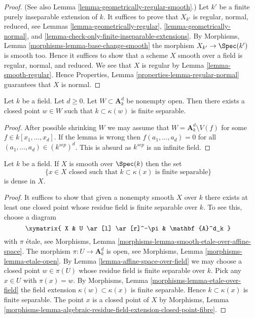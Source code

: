 \begin{proof}
(See also
Lemma \ref{lemma-geometrically-regular-smooth}.)
Let $k'$ be a finite purely inseparable extension of $k$.
It suffices to prove that $X_{k'}$ is regular, normal, reduced, see
Lemmas \ref{lemma-geometrically-regular},
\ref{lemma-geometrically-normal}, and
\ref{lemma-check-only-finite-inseparable-extensions}.
By
Morphisms, Lemma \ref{morphisms-lemma-base-change-smooth}
the morphism $X_{k'} \to \Spec(k')$ is smooth too.
Hence it suffices to show that a scheme $X$ smooth over a field is regular,
normal, and reduced. We see that $X$ is regular by
Lemma \ref{lemma-smooth-regular}.
Hence
Properties, Lemma \ref{properties-lemma-regular-normal}
guarantees that $X$ is normal.
\end{proof}

\begin{lemma}
\label{lemma-affine-space-over-field}
Let $k$ be a field. Let $d \geq 0$. Let $W \subset \mathbf{A}^d_k$
be nonempty open. Then there exists a closed point $w \in W$ such that
$k \subset \kappa(w)$ is finite separable.
\end{lemma}

\begin{proof}
After possible shrinking $W$ we may assume that
$W = \mathbf{A}^d_k \setminus V(f)$ for some $f \in k[x_1, \ldots, x_d]$.
If the lemma is wrong then $f(a_1, \ldots, a_d) = 0$ for all
$(a_1, \ldots, a_d) \in (k^{sep})^d$. This is absurd as $k^{sep}$
is an infinite field.
\end{proof}

\begin{lemma}
\label{lemma-smooth-separable-closed-points-dense}
Let $k$ be a field. If $X$ is smooth over $\Spec(k)$ then
the set
$$
\{x \in X\text{ closed such that }k \subset \kappa(x)
\text{ is finite separable}\}
$$
is dense in $X$.
\end{lemma}

\begin{proof}
It suffices to show that given a nonempty smooth $X$ over $k$
there exists at least one closed point whose residue field is
finite separable over $k$. To see this, choose a diagram
$$
\xymatrix{
X & U \ar[l] \ar[r]^-\pi & \mathbf{A}^d_k
}
$$
with $\pi$ \'etale, see
Morphisms, Lemma \ref{morphisms-lemma-smooth-etale-over-affine-space}.
The morphism $\pi : U \to \mathbf{A}^d_k$ is open, see
Morphisms, Lemma \ref{morphisms-lemma-etale-open}.
By
Lemma \ref{lemma-affine-space-over-field}
we may choose a closed point $w \in \pi(U)$ whose residue field is
finite separable over $k$. Pick any $x \in U$ with $\pi(x) = w$. By
Morphisms, Lemma \ref{morphisms-lemma-etale-over-field}
the field extension $\kappa(w) \subset \kappa(x)$ is finite separable.
Hence $k \subset \kappa(x)$ is finite separable. The point $x$ is a
closed point of $X$ by
Morphisms, Lemma
\ref{morphisms-lemma-algebraic-residue-field-extension-closed-point-fibre}.
\end{proof}

